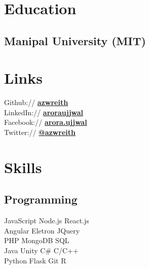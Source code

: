 \documentclass[a4paper]{resume}
\begin{document}
\begin{minipage}[t]{0.33\textwidth} %


\section{Education}

\subsection{Manipal University (MIT)}




\section{Links}

Github:// \href{https://github.com/azwreith}{\bf azwreith} \\
LinkedIn:// \href{https://in.linkedin.com/in/aroraujjwal}{\bf aroraujjwal} \\
Facebook:// \href{https://www.facebook.com/arora.ujjwal}{\bf arora.ujjwal} \\
Twitter:// \href{https://twitter.com/DarthUjj}{\bf @azwreith} \\

\sectionspace %



\section{Skills}

\subsection{Programming}
JavaScript \textbullet{} Node.js \textbullet{}  React.js \\
Angular \textbullet{} Eletron \textbullet{} JQuery \\
PHP \textbullet{} MongoDB \textbullet{} SQL \\
Java \textbullet{} Unity \textbullet{} C\# \textbullet{} C/C++ \\
Python \textbullet{} Flask \textbullet{} Git \textbullet{} R \\


\end{minipage}
\end{document}
